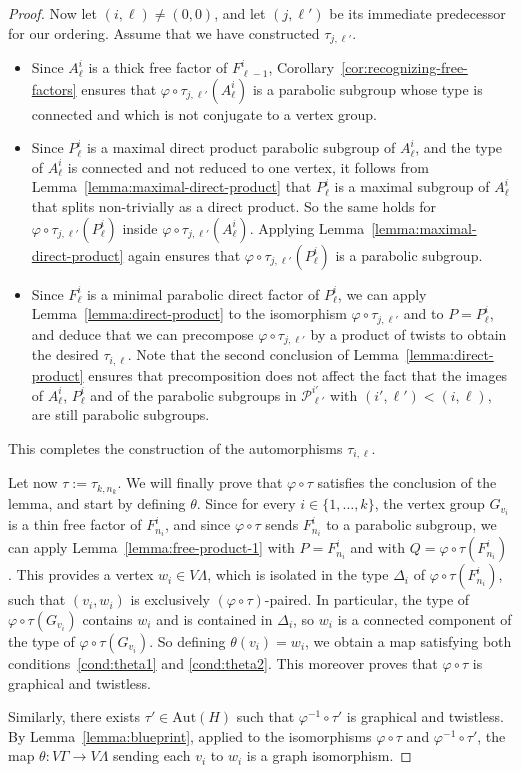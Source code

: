 \documentclass[a4paper,english,11pt]{article}
\theoremstyle{definition}
\theoremstyle{remark}
\newcommand{\Aut}{\mathrm{Aut}}
\begin{document}
\begin{proof}
Now let $(i,\ell)\neq (0,0)$, and let $(j,\ell')$ be its immediate predecessor for our ordering. Assume that we have constructed $\tau_{j,\ell'}$. 
\begin{itemize}
    \item Since $A^i_\ell$ is a thick free factor of $F^i_{\ell-1}$, Corollary~\ref{cor:recognizing-free-factors} ensures that $\varphi\circ\tau_{j,\ell'}(A^i_\ell)$ is a parabolic subgroup whose type is connected and which is not conjugate to a vertex group.  
    \item Since $P_\ell^i$ is a maximal direct product parabolic subgroup of $A_\ell^i$, and the type of $A_\ell^i$ is connected and not reduced to one vertex, it follows from Lemma~\ref{lemma:maximal-direct-product} that $P_\ell^i$ is a maximal subgroup of $A_\ell^i$ that splits non-trivially as a direct product. So the same holds for $\varphi\circ\tau_{j,\ell'}(P^i_\ell)$ inside $\varphi\circ\tau_{j,\ell'}(A^i_\ell)$. Applying Lemma~\ref{lemma:maximal-direct-product} again ensures that $\varphi\circ\tau_{j,\ell'}(P_\ell^i)$ is a parabolic subgroup.
    \item Since $F_\ell^i$ is a minimal parabolic direct factor of $P_\ell^i$, we can apply Lemma~\ref{lemma:direct-product} to the isomorphism $\varphi \circ \tau_{j,\ell'}$ and to $P=P^i_\ell$, and deduce that we can precompose $\varphi\circ\tau_{j,\ell'}$ by a product of twists to obtain the desired $\tau_{i,\ell}$. Note that the second conclusion of Lemma~\ref{lemma:direct-product} ensures that precomposition does not affect the fact that the images of $A^i_\ell$, $P^i_\ell$ and of the parabolic subgroups in $\mathcal{P}^{i'}_{\ell'}$ with $(i',\ell')<(i,\ell)$, are still parabolic subgroups. 
\end{itemize}
This completes the construction of the automorphisms $\tau_{i,\ell}$. 

Let now $\tau:=\tau_{k,n_k}$. We will finally prove that $\varphi\circ\tau$ satisfies the conclusion of the lemma, and start by defining $\theta$. Since for every $i\in\{1,\dots,k\}$, the vertex group $G_{v_i}$ is a thin free factor of $F_{n_i}^i$, and since $\varphi\circ\tau$ sends $F_{n_i}^i$ to a parabolic subgroup, we can apply Lemma~\ref{lemma:free-product-1} with $P=F_{n_i}^i$ and with $Q=\varphi\circ\tau(F_{n_i}^i)$. This provides a vertex $w_i\in V\Lambda$, which is isolated in the type $\Delta_i$ of $\varphi\circ\tau(F_{n_i}^i)$, such that $(v_i,w_i)$ is exclusively $(\varphi\circ\tau)$-paired. 
In particular, the type of $\varphi\circ\tau(G_{v_i})$ contains $w_i$ and is contained in $\Delta_i$, so $w_i$ is a connected component of the type of $\varphi\circ\tau(G_{v_i})$. So defining $\theta(v_i)=w_i$, we obtain a map satisfying both conditions~\ref{cond:theta1} and \ref{cond:theta2}.
This moreover proves that $\varphi\circ\tau$ is graphical and twistless. 

Similarly, there exists $\tau'\in\Aut(H)$ such that $\varphi^{-1}\circ\tau'$ is graphical and twistless. By Lemma~\ref{lemma:blueprint}, applied to the isomorphisms $\varphi\circ\tau$ and $\varphi^{-1}\circ\tau'$, the map $\theta:V\Gamma\to V\Lambda$ sending each $v_i$ to $w_i$ is a graph isomorphism. 
\end{proof}
\end{document}
